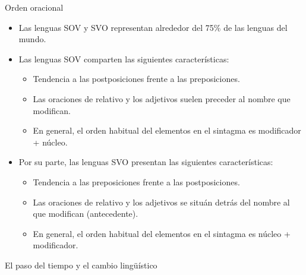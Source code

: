 \documentclass[handout]{beamer}
\begin{document}
\begin{frame}{Orden oracional}
\begin{itemize}
	\item Las lenguas SOV y SVO representan alrededor del 75\% de las lenguas del mundo. 
	\item Las lenguas SOV comparten las siguientes características:
	\begin{itemize}
		\item Tendencia a las postposiciones frente a las preposiciones.
		\item Las oraciones de relativo y los adjetivos suelen preceder al nombre que modifican. 
		\item En general, el orden habitual del elementos en el sintagma es modificador + núcleo.
	\end{itemize}
	\item Por su parte, las lenguas SVO presentan las siguientes características:
	\begin{itemize}
		\item Tendencia a las preposiciones frente a las postposiciones.
		\item Las oraciones de relativo y los adjetivos se situán detrás del nombre al que modifican (antecedente).
		\item En general, el orden habitual del elementos en el sintagma es núcleo + modificador.
	\end{itemize}\end{itemize}

\end{frame}
	


\begin{frame}{}
\begin{center}
\LARGE El paso del tiempo y el cambio lingüístico 
\end{center}
\end{frame}
\end{document}
